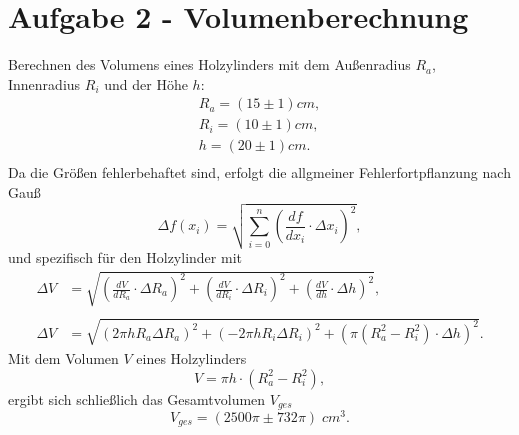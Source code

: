 \section{Aufgabe 2 - Volumenberechnung}
    Berechnen des Volumens eines Holzylinders mit dem Außenradius $R_a$, Innenradius $R_i$ und
    der Höhe $h$:
    \begin{align*}
        R_{a}=(15 \pm 1) \si{cm},\\
        R_{i}=(10 \pm 1) \si{cm},\\
        h=(20 \pm 1) \si{cm}.\\
    \end{align*}
    Da die Größen fehlerbehaftet sind, erfolgt die allgmeiner Fehlerfortpflanzung nach Gauß
    \begin{equation*}
        \Delta f(x_i)=\sqrt{\sum_{i=0}^n \left(\frac{df}{dx_i}\cdot \Delta x_i \right) ^2},
    \end{equation*}
    und spezifisch für den Holzylinder mit
    \begin{align*}
        \Delta V &= \sqrt{\left(\frac{dV}{dR_{a}}\cdot \Delta R_{a}\right)^2 + \left(\frac{dV}{dR_{i}}\cdot \Delta R_{i}\right)^2 + \left(\frac{dV}{dh}\cdot \Delta h\right)^2},\\\\
        \Delta V &= \sqrt{(2 \pi h R_a \Delta R_a)^2 + (-2 \pi h R_i \Delta R_i)^2 + (\pi (R_a^2-R_i^2) \cdot \Delta h)^2} .
    \end{align*}
    Mit dem Volumen $V$ eines Holzylinders
    \begin{equation*}
        V= \pi h \cdot(R_{a}^2-R_{i}^2),
    \end{equation*}
    ergibt sich schließlich das Gesamtvolumen $V_{ges}$
    \begin{equation*}
        V_{ges}=(2500\pi \pm 732\pi)\; \si{cm^3}.
    \end{equation*}